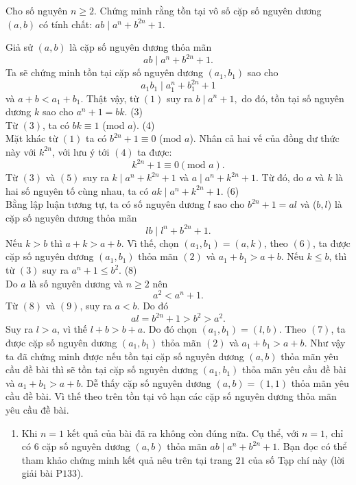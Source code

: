 \begin{bt}%
	Cho số nguyên $n \ge2$. Chứng minh rằng tồn tại vô số cặp số nguyên dương $(a,b)$ có tính chất: $	ab \mid  a^n +b^{2n} +1.$
	\loigiai
	{ Giả sử $(a,b)$ là cặp số nguyên dương thỏa mãn 
		\[ab \mid  a^n +b^{2n} +1.\tag{1}\]
		Ta sẽ chứng minh tồn tại cặp số nguyên dương $(a_1,b_1)$ sao cho 
		\[a_1 b_1 \mid  a_1^n +b_1^{2n} +1\tag{2}\]
		và $a+b<a_1 +b_1.$
		Thật vậy, từ $(1)$ suy ra $b\mid a^n +1,$ do đó, tồn tại số nguyên dương $k$ sao cho $a^n +1=bk.$ \hfill(3)\\
		Từ $(3)$, ta có  $bk \equiv 1$  (mod $a$). \hfill(4)\\
		Mặt khác từ  $(1)$ ta có $b^{2n}+1 \equiv 0$ (mod $a$). Nhân cả hai vế của đồng dư thức này với $k^{2n}$, với lưu ý tới $(4)$ ta được: 
		\[	k^{2n}+1 \equiv 0  \left( \text{mod } a\right).\tag{5}\]
		Từ $(3)$ và $(5)$ suy ra $k\mid a^n + k^{2n}+1$ và $a\mid a^n + k^{2n}+1$. Từ đó, do $a$ và $k$ là hai số nguyên tố cùng nhau, ta có $ak\mid a^n + k^{2n}+1. $ \hfill(6)\\
		Bằng lập luận tương tự, ta có số nguyên dương $l$ sao cho $b^{2n}+1=al$ và ($b,l$) là cặp số nguyên dương thỏa mãn
		\[lb\mid l^n + b^{2n}+1.\tag{7}\]		
		Nếu $k>b$ thì $a+k>a+b$. Vì thế, chọn $(a_1,b_1)=(a,k)$, theo $(6)$, ta được cặp số nguyên dương $(a_1,b_1)$ thỏa mãn $(2)$ và $a_1 +b_1 >a+b$.		
		Nếu $k\le b$, thì từ $(3)$ suy ra $a^n +1 \le b^2.$ \hfill(8)\\
		Do $a$ là số nguyên dương và $n \ge 2$ nên
		\[a^2 <a^n +1.\tag{9}\]
		Từ $(8)$ và $(9)$, suy ra $a<b$. Do đó
		$$al=b^{2n} +1 > b^2 > a^2.$$
		Suy ra $l>a$, vì thế $l+b > b+a$. Do đó chọn $(a_1,b_1)= (l,b)$. Theo $(7)$, ta được cặp số nguyên dương $(a_1,b_1)$ thỏa mãn $(2)$ và $a_1+b_1 > a+b$.		
		Như vậy ta đã chứng minh được nếu tồn tại cặp số nguyên dương $(a,b)$ thỏa mãn yêu cầu đề bài thì sẽ tồn tại cặp số nguyên dương $(a_1,b_1)$ thỏa mãn yêu cầu đề bài và $a_1+b_1 > a+b$.		
		Dễ thấy cặp số nguyên dương $(a,b)=(1,1)$ thỏa mãn yêu cầu đề bài. Vì thế theo trên tồn tại vô hạn các cặp số nguyên dương thỏa mãn yêu cầu đề bài.
\begin{nx}\hfill
	\begin{enumerate}[\bf 1.]
		\item Khi $n=1$ kết quả của bài đã ra không còn đúng nữa. Cụ thể, với $n=1$, chỉ có $6$ cặp số nguyên dương $(a,b)$ thỏa mãn $	ab \mid  a^n +b^{2n} +1.$ Bạn đọc có thể tham khảo chứng minh kết quả nêu trên tại trang $21$ của số Tạp chí này (lời giải bài P$133$).
		

\end{enumerate}
\end{nx}}
\end{bt}
